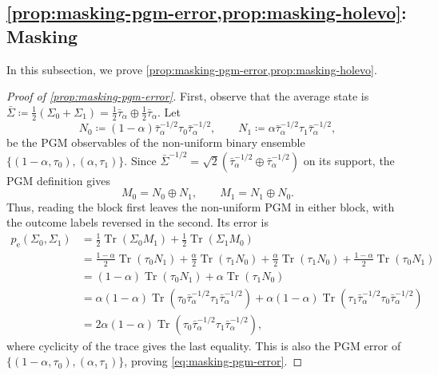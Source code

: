 \documentclass[11pt]{article}
\theoremstyle{remark}
\newcommand{\Tr}{\operatorname{Tr}}
\begin{document}
\subsection{\texorpdfstring{\cref{prop:masking-pgm-error,prop:masking-holevo}}{Propositions  and }: Masking}
\label{appsubsec:proof-masking}

In this subsection, we prove \cref{prop:masking-pgm-error,prop:masking-holevo}.

\begin{proof}[Proof of \cref{prop:masking-pgm-error}]
First, observe that the average state is $\bar{\Sigma} \coloneqq \frac{1}{2}(\Sigma_0+\Sigma_1) = \frac{1}{2}\bar{\tau}_\alpha \oplus \frac{1}{2}\bar{\tau}_\alpha$. Let
\begin{equation*}
N_0 \coloneqq (1-\alpha)\bar{\tau}_\alpha^{-1/2}\tau_0\bar{\tau}_\alpha^{-1/2},
\qquad
N_1 \coloneqq \alpha\bar{\tau}_\alpha^{-1/2}\tau_1\bar{\tau}_\alpha^{-1/2},
\end{equation*}
be the PGM observables of the non-uniform binary ensemble $\{(1-\alpha,\tau_0),(\alpha,\tau_1)\}$. Since $\bar{\Sigma}^{-1/2} = \sqrt{2}(\bar{\tau}_\alpha^{-1/2} \oplus \bar{\tau}_\alpha^{-1/2})$ on its support, the PGM definition gives
\begin{equation*}
M_0 = N_0 \oplus N_1,
\qquad
M_1 = N_1 \oplus N_0.
\end{equation*}
Thus, reading the block first leaves the non-uniform PGM in either block, with the outcome labels reversed in the second. Its error is
\begin{align*}
p_{\mathrm{e}}(\Sigma_0,\Sigma_1)
&= \frac{1}{2}\Tr(\Sigma_0M_1) + \frac{1}{2}\Tr(\Sigma_1M_0) \\
&= \frac{1-\alpha}{2}\Tr(\tau_0N_1) + \frac{\alpha}{2}\Tr(\tau_1N_0) + \frac{\alpha}{2}\Tr(\tau_1N_0) + \frac{1-\alpha}{2}\Tr(\tau_0N_1) \\
&= (1-\alpha)\Tr(\tau_0N_1)+\alpha\Tr(\tau_1N_0) \\
&= \alpha(1-\alpha)\Tr(\tau_0 \bar{\tau}_\alpha^{-1/2} \tau_1 \bar{\tau}_\alpha^{-1/2})
+\alpha(1-\alpha)\Tr(\tau_1 \bar{\tau}_\alpha^{-1/2}\tau_0 \bar{\tau}_\alpha^{-1/2}) \\
&= 2\alpha(1-\alpha)\Tr(\tau_0 \bar{\tau}_\alpha^{-1/2}\tau_1 \bar{\tau}_\alpha^{-1/2}),
\end{align*}
where cyclicity of the trace gives the last equality. This is also the PGM error of $\{(1-\alpha,\tau_0),(\alpha,\tau_1)\}$, proving \eqref{eq:masking-pgm-error}.
\end{proof}
\end{document}
